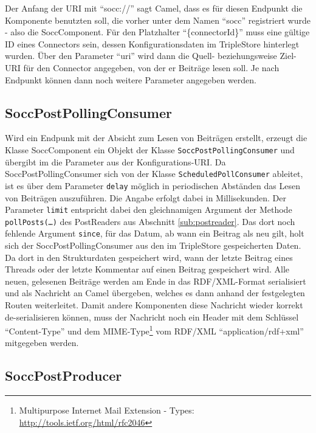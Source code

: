 Der Anfang der URI mit \enquote{socc://} sagt Camel, dass es für diesen Endpunkt die Komponente benutzten soll, die vorher unter dem Namen \enquote{socc} registriert wurde - also die SoccComponent. Für den Platzhalter \enquote{\{connectorId\}} muss eine gültige ID eines Connectors sein, dessen Konfigurationsdaten im TripleStore hinterlegt wurden. Über den Parameter \enquote{uri} wird dann die Quell- beziehungsweise Ziel-URI für den Connector angegeben, von der er Beiträge lesen soll. Je nach Endpunkt können dann noch weitere Parameter angegeben werden. 

\subsection{SoccPostPollingConsumer} %
\label{sub:soccpostpollingconsumer}

Wird ein Endpunk mit der Absicht zum Lesen von Beiträgen erstellt, erzeugt die Klasse SoccComponent ein Objekt der Klasse \texttt{SoccPostPollingConsumer} und übergibt im die Parameter aus der Konfigurations-URI. Da SoccPostPollingConsumer sich von der Klasse \texttt{ScheduledPollConsumer} ableitet, ist es über dem Parameter \texttt{delay} möglich in periodischen Abständen das Lesen von Beiträgen auszuführen. Die Angabe erfolgt dabei in Millisekunden. Der Parameter \texttt{limit} entspricht dabei den gleichnamigen Argument der Methode \texttt{pollPosts(\dots)} des PostReaders aus Abschnitt \ref{sub:postreader}. Das dort noch fehlende Argument \texttt{since}, für das Datum, ab wann ein Beitrag als neu gilt, holt sich der SoccPostPollingConsumer aus den im TripleStore gespeicherten Daten. Da dort in den Strukturdaten gespeichert wird, wann der letzte Beitrag eines Threads oder der letzte Kommentar auf einen Beitrag gespeichert wird. Alle neuen, gelesenen Beiträge werden am Ende in das RDF/XML-Format serialisiert und als Nachricht an Camel übergeben, welches es dann anhand der festgelegten Routen weiterleitet. Damit andere Komponenten diese Nachricht wieder korrekt de-serialisieren können, muss der Nachricht noch ein Header mit dem Schlüssel \enquote{Content-Type} und dem MIME-Type\footnote{ Multipurpose Internet Mail Extension - Types: \url{http://tools.ietf.org/html/rfc2046}} vom RDF/XML \enquote{application/rdf+xml} mitgegeben werden.


\subsection{SoccPostProducer} %
\label{sub:soccpostproducer}

